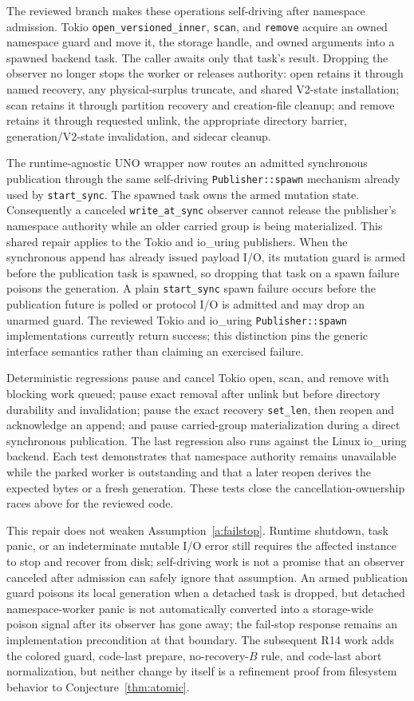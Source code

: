 \documentclass[10pt,twocolumn]{article}
\theoremstyle{remark}
\newcommand{\code}[1]{\texttt{#1}}
\begin{document}
The reviewed branch makes these operations self-driving after namespace admission. Tokio
\code{open\_versioned\_inner}, \code{scan}, and \code{remove} acquire an owned namespace guard and
move it, the storage handle, and owned arguments into a spawned backend task. The caller awaits only
that task's result. Dropping the observer no longer stops the worker or releases authority: open
retains it through named recovery, any physical-surplus truncate, and shared V2-state installation;
scan retains it through partition recovery and creation-file cleanup; and remove retains it through
requested unlink, the appropriate directory barrier, generation/V2-state invalidation, and sidecar
cleanup.

The runtime-agnostic UNO wrapper now routes an admitted synchronous publication through the same
self-driving \code{Publisher::spawn} mechanism already used by \code{start\_sync}. The spawned task
owns the armed mutation state. Consequently a canceled \code{write\_at\_sync} observer cannot release
the publisher's namespace authority while an older carried group is being materialized. This shared
repair applies to the Tokio and io\_uring publishers. When the synchronous append has already
issued payload I/O, its mutation guard is armed before the publication task is spawned, so dropping
that task on a spawn failure poisons the generation. A plain \code{start\_sync} spawn failure occurs
before the publication future is polled or protocol I/O is admitted and may drop an unarmed guard.
The reviewed Tokio and io\_uring \code{Publisher::spawn} implementations currently return success;
this distinction pins the generic interface semantics rather than claiming an exercised failure.

Deterministic regressions pause and cancel Tokio open, scan, and remove with blocking work queued;
pause exact removal after unlink but before directory durability and invalidation; pause the exact
recovery \code{set\_len}, then reopen and acknowledge an append; and pause carried-group
materialization during a direct synchronous publication. The last regression also runs against the
Linux io\_uring backend. Each test demonstrates that namespace authority remains unavailable while the
parked worker is outstanding and that a later reopen derives the expected bytes or a fresh
generation. These tests close the cancellation-ownership races above for the reviewed code.

This repair does not weaken Assumption~\ref{a:failstop}. Runtime shutdown, task panic, or an
indeterminate mutable I/O error still requires the affected instance to stop and recover from disk;
self-driving work is not a promise that an observer canceled after admission can safely ignore that
assumption. An armed publication guard poisons its local generation when a detached task is dropped,
but detached namespace-worker panic is not automatically converted into a storage-wide poison
signal after its observer has gone away; the fail-stop response remains an implementation
precondition at that boundary. The subsequent R14 work adds the colored guard, code-last prepare,
no-recovery-$B$ rule, and code-last abort normalization, but neither change by itself is a
refinement proof from filesystem behavior to Conjecture~\ref{thm:atomic}.
\end{document}
